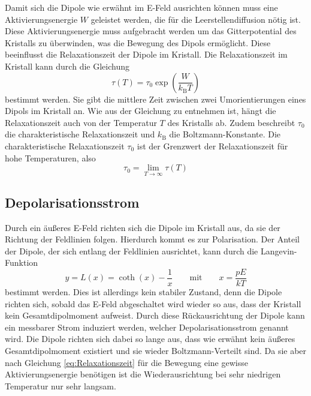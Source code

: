 Damit sich die Dipole wie erwähnt im E-Feld ausrichten können muss eine Aktivierungsenergie $W$ geleistet werden, die für die Leerstellendiffusion nötig ist.
Diese Aktivierungsenergie muss aufgebracht werden um das Gitterpotential des Kristalls zu überwinden, was die Bewegung des Dipols ermöglicht.
Diese beeinflusst die Relaxationszeit der Dipole im Kristall.
Die Relaxationszeit im Kristall kann durch die Gleichung 
\begin{equation}
    \tau(T) = \tau_0 \exp( \frac{W}{k_\text{B} T})
    \label{eq:Relaxationszeit}
\end{equation}
bestimmt werden.
Sie gibt die mittlere Zeit zwischen zwei Umorientierungen eines Dipols im Kristall an.
Wie aus der Gleichung zu entnehmen ist, hängt die Relaxationszeit auch von der Temperatur $T$ des Kristalls ab.
Zudem beschreibt $\tau_0$ die charakteristische Relaxationszeit und $k_\text{B}$ die Boltzmann-Konstante.
Die charakteristische Relaxationszeit $\tau_0$ ist der Grenzwert der Relaxationszeit für hohe Temperaturen, also
\begin{equation*}
    \tau_0 = \lim\limits_{T\rightarrow\infty}{\tau(T)}
\end{equation*}
 
\subsection{Depolarisationsstrom}
Durch ein äußeres E-Feld richten sich die Dipole im Kristall aus, da sie der Richtung der Feldlinien folgen.
Hierdurch kommt es zur Polarisation.
Der Anteil der Dipole, der sich entlang der Feldlinien ausrichtet, kann durch die Langevin-Funktion
\begin{equation}
    y = L(x) = \coth(x)-\frac{1}{x} \qquad \text{mit} \qquad x=\frac{pE}{kT}
    \label{eq:Langevin}
\end{equation}
bestimmt werden.
Dies ist allerdings kein stabiler Zustand, denn die Dipole richten sich, sobald das E-Feld abgeschaltet wird wieder so aus, dass der Kristall kein Gesamtdipolmoment aufweist.
Durch diese Rückausrichtung der Dipole kann ein messbarer Strom induziert werden, welcher Depolarisationsstrom genannt wird.
Die Dipole richten sich dabei so lange aus, dass wie erwähnt kein äußeres Gesamtdipolmoment existiert und sie wieder Boltzmann-Verteilt sind.
Da sie aber nach Gleichung \eqref{eq:Relaxationszeit} für die Bewegung eine gewisse Aktivierungsenergie benötigen ist die Wiederausrichtung bei sehr niedrigen Temperatur nur sehr langsam.

